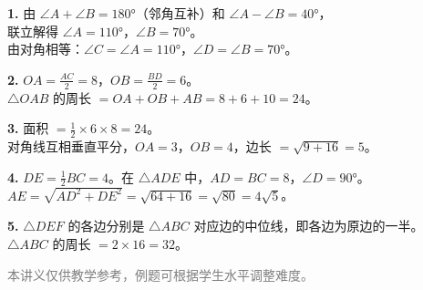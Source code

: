 \documentclass[12pt, a4paper]{ctexart}
\begin{document}
\vspace{10pt}

\begin{knowledgebox}[参考答案]
\textbf{1.} 由 $\angle A + \angle B = 180°$（邻角互补）和 $\angle A - \angle B = 40°$，\\
联立解得 $\angle A = 110°$，$\angle B = 70°$。\\
由对角相等：$\angle C = \angle A = 110°$，$\angle D = \angle B = 70°$。

\vspace{4pt}
\textbf{2.} $OA = \frac{AC}{2} = 8$，$OB = \frac{BD}{2} = 6$。\\
$\triangle OAB$ 的周长 $= OA + OB + AB = 8 + 6 + 10 = 24$。

\vspace{4pt}
\textbf{3.} 面积 $= \frac{1}{2} \times 6 \times 8 = 24$。\\
对角线互相垂直平分，$OA = 3$，$OB = 4$，边长 $= \sqrt{9+16} = 5$。

\vspace{4pt}
\textbf{4.} $DE = \frac{1}{2}BC = 4$。在 $\triangle ADE$ 中，$AD = BC = 8$，$\angle D = 90°$。\\
$AE = \sqrt{AD^2 + DE^2} = \sqrt{64 + 16} = \sqrt{80} = 4\sqrt{5}$。

\vspace{4pt}
\textbf{5.} $\triangle DEF$ 的各边分别是 $\triangle ABC$ 对应边的中位线，即各边为原边的一半。\\
$\triangle ABC$ 的周长 $= 2 \times 16 = 32$。
\end{knowledgebox}

\vfill
\begin{center}
\small\textcolor{gray}{本讲义仅供教学参考，例题可根据学生水平调整难度。}
\end{center}
\end{document}
